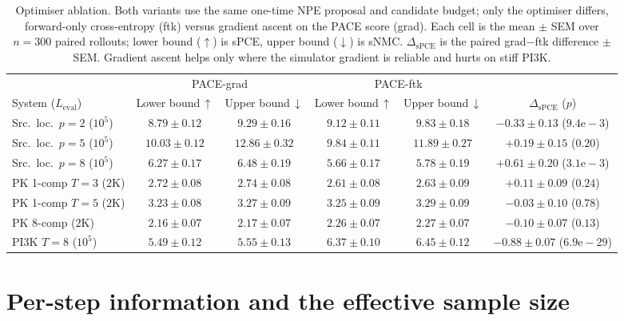 \begin{table}[t]
\centering\small
\caption[Optimiser ablation]{Optimiser ablation. Both variants use the same one-time
NPE proposal and candidate budget; only the optimiser differs, forward-only
cross-entropy (ftk) versus gradient ascent on the PACE score (grad). Each cell is the
mean $\pm$ SEM over $n=300$ paired rollouts; lower bound ($\uparrow$) is sPCE, upper
bound ($\downarrow$) is sNMC. $\Delta_{\mathrm{sPCE}}$ is the paired grad${-}$ftk
difference $\pm$ SEM. Gradient ascent helps only where the simulator gradient is
reliable and hurts on stiff PI3K.}
\label{tab:ablation}
\begin{tabular}{lcccc c}
\toprule
& \multicolumn{2}{c}{PACE-grad} & \multicolumn{2}{c}{PACE-ftk} & \\
\cmidrule(lr){2-3}\cmidrule(lr){4-5}
System ($L_{\mathrm{eval}}$) & Lower bound\,$\uparrow$ & Upper bound\,$\downarrow$ & Lower bound\,$\uparrow$ & Upper bound\,$\downarrow$ & $\Delta_{\mathrm{sPCE}}$ ($p$) \\
\midrule
Src.\ loc.\ $p{=}2$ ($10^5$) & $8.79{\pm}0.12$ & $9.29{\pm}0.16$ & $9.12{\pm}0.11$ & $9.83{\pm}0.18$ & $-0.33{\pm}0.13$ ($9.4\mathrm{e}{-}3$) \\
Src.\ loc.\ $p{=}5$ ($10^5$) & $10.03{\pm}0.12$ & $12.86{\pm}0.32$ & $9.84{\pm}0.11$ & $11.89{\pm}0.27$ & $+0.19{\pm}0.15$ ($0.20$) \\
Src.\ loc.\ $p{=}8$ ($10^5$) & $6.27{\pm}0.17$ & $6.48{\pm}0.19$ & $5.66{\pm}0.17$ & $5.78{\pm}0.19$ & $+0.61{\pm}0.20$ ($3.1\mathrm{e}{-}3$) \\
PK 1-comp $T{=}3$ ($2$K) & $2.72{\pm}0.08$ & $2.74{\pm}0.08$ & $2.61{\pm}0.08$ & $2.63{\pm}0.09$ & $+0.11{\pm}0.09$ ($0.24$) \\
PK 1-comp $T{=}5$ ($2$K) & $3.23{\pm}0.08$ & $3.27{\pm}0.09$ & $3.25{\pm}0.09$ & $3.29{\pm}0.09$ & $-0.03{\pm}0.10$ ($0.78$) \\
PK 8-comp ($2$K)    & $2.16{\pm}0.07$ & $2.17{\pm}0.07$ & $2.26{\pm}0.07$ & $2.27{\pm}0.07$ & $-0.10{\pm}0.07$ ($0.13$) \\
PI3K $T{=}8$ ($10^5$) & $5.49{\pm}0.12$ & $5.55{\pm}0.13$ & $6.37{\pm}0.10$ & $6.45{\pm}0.12$ & $-0.88{\pm}0.07$ ($6.9\mathrm{e}{-}29$) \\
\bottomrule
\end{tabular}
\end{table}

\section{Per-step information and the effective sample size}
\label{sec:r-perstep}

